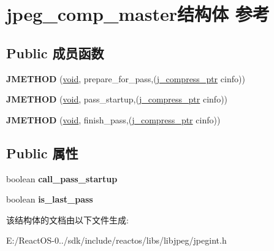 \hypertarget{structjpeg__comp__master}{}\section{jpeg\+\_\+comp\+\_\+master结构体 参考}
\label{structjpeg__comp__master}
\subsection*{Public 成员函数}
\begin{DoxyCompactItemize}
\item 
\mbox{\label{structjpeg__comp__master_afdbee5aedaedd9c6c9837b6bfd834a63}} 
{\bfseries J\+M\+E\+T\+H\+OD} (\hyperlink{interfacevoid}{void}, prepare\+\_\+for\+\_\+pass,(\hyperlink{structjpeg__compress__struct}{j\+\_\+compress\+\_\+ptr} cinfo))
\item 
\mbox{\label{structjpeg__comp__master_ac7e4391d1afe92c685cb4ffea5383d2c}} 
{\bfseries J\+M\+E\+T\+H\+OD} (\hyperlink{interfacevoid}{void}, pass\+\_\+startup,(\hyperlink{structjpeg__compress__struct}{j\+\_\+compress\+\_\+ptr} cinfo))
\item 
\mbox{\label{structjpeg__comp__master_a81648a22581acb403aa707a5e56bf993}} 
{\bfseries J\+M\+E\+T\+H\+OD} (\hyperlink{interfacevoid}{void}, finish\+\_\+pass,(\hyperlink{structjpeg__compress__struct}{j\+\_\+compress\+\_\+ptr} cinfo))
\end{DoxyCompactItemize}
\subsection*{Public 属性}
\begin{DoxyCompactItemize}
\item 
\mbox{\label{structjpeg__comp__master_a72c70556604030b6b10d798f6c193e6f}} 
boolean {\bfseries call\+\_\+pass\+\_\+startup}
\item 
\mbox{\label{structjpeg__comp__master_aac35b3d9e718376d1aacdde9df32e75d}} 
boolean {\bfseries is\+\_\+last\+\_\+pass}
\end{DoxyCompactItemize}


该结构体的文档由以下文件生成\+:\begin{DoxyCompactItemize}
\item 
E\+:/\+React\+O\+S-\/0../sdk/include/reactos/libs/libjpeg/jpegint.\+h\end{DoxyCompactItemize}
